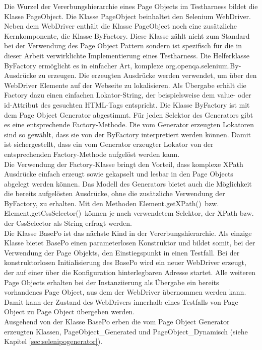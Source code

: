 Die Wurzel der Vererbungshierarchie eines Page Objects im Testharness bildet die Klasse PageObject. Die Klasse PageObject beinhaltet den Selenium WebDriver. Neben dem WebDriver enthält die Klasse PageObject noch eine zusätzliche Kernkomponente, die Klasse ByFactory. Diese Klasse zählt nicht zum Standard bei der Verwendung des Page Object Pattern sondern ist spezifisch für die in dieser Arbeit verwirklichte Implementierung eines Testharness.
Die Helferklasse ByFactory ermöglicht es in einfacher Art, komplexe \grq org.openqa.selenium.By\grq -Ausdrücke zu erzeugen. Die erzeugten Ausdrücke werden verwendet, um über den WebDriver Elemente auf der Webseite zu lokalisieren. Als Übergabe erhält die Factory dazu einen einfachen Lokator-String, der beispielsweise dem value- oder id-Attribut des gesuchten HTML-Tags entspricht. Die Klasse ByFactory ist mit dem Page Object Generator abgestimmt. Für jeden Selektor des Generators gibt es eine entsprechende Factory-Methode. Die vom Generator erzeugten Lokatoren sind so gewählt, dass sie von der ByFactory interpretiert werden können. Damit ist sichergestellt, dass ein vom Generator erzeugter Lokator von der entsprechenden Factory-Methode aufgelöst werden kann.\\
Die Verwendung der Factory-Klasse bringt den Vorteil, dass komplexe XPath Ausdrücke einfach erzeugt sowie gekapselt und lesbar in den Page Objects abgelegt werden können. 
Das Modell des Generators bietet auch die Möglichkeit die bereits aufgelösten Ausdrücke, ohne die zusätzliche Verwendung der ByFactory, zu erhalten.
Mit den Methoden  \grq Element.getXPath()\grq\ bzw.  \grq Element.getCssSelector()\grq\ können je nach verwendetem Selektor, der XPath bzw. der CssSelector als String erfragt werden. \\
Die Klasse BasePo ist das nächste Kind in der Vererbungshierarchie. Als einzige Klasse bietet BasePo einen parameterlosen Konstruktor und bildet somit, bei der Verwendung der Page Objekts, den Einstiegspunkt in einen Testfall. Bei der konstruktorlosen Initialisierung des BasePo wird ein neuer WebDriver erzeugt, der auf einer über die Konfiguration hinterlegbaren Adresse startet.
Alle weiteren Page Objects erhalten bei der Instanziierung als Übergabe ein bereits vorhandenes Page Object, aus dem der WebDriver übernommen werden kann.
Damit kann der Zustand des WebDrivers innerhalb eines Testfalls von Page Object zu Page Object übergeben werden.\\
Ausgehend von der Klasse BasePo erben die vom Page Object Generator erzeugten Klassen, PageObject\_Generated und PageObject\_Dynamisch (siehe Kapitel \ref{sec:selenipogenerator}).
